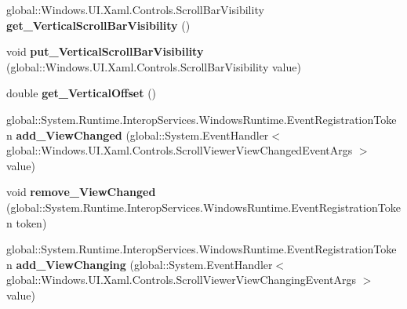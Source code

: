 \begin{DoxyCompactItemize}
\mbox{\label{class_windows_1_1_u_i_1_1_xaml_1_1_controls_1_1_scroll_viewer_ae2150cc90ac054e44b19688d45254504}} 
global\+::\+Windows.\+U\+I.\+Xaml.\+Controls.\+Scroll\+Bar\+Visibility {\bfseries get\+\_\+\+Vertical\+Scroll\+Bar\+Visibility} ()
\item 
\mbox{\label{class_windows_1_1_u_i_1_1_xaml_1_1_controls_1_1_scroll_viewer_a4ebc42955ec0b6a9d1bb937a99db8d5a}} 
void {\bfseries put\+\_\+\+Vertical\+Scroll\+Bar\+Visibility} (global\+::\+Windows.\+U\+I.\+Xaml.\+Controls.\+Scroll\+Bar\+Visibility value)
\item 
\mbox{\label{class_windows_1_1_u_i_1_1_xaml_1_1_controls_1_1_scroll_viewer_a19208c9fc6f7a5b20ce2809e891eaf0a}} 
double {\bfseries get\+\_\+\+Vertical\+Offset} ()
\item 
\mbox{\label{class_windows_1_1_u_i_1_1_xaml_1_1_controls_1_1_scroll_viewer_ac4976aefef665f53fb870e4ce8813d73}} 
global\+::\+System.\+Runtime.\+Interop\+Services.\+Windows\+Runtime.\+Event\+Registration\+Token {\bfseries add\+\_\+\+View\+Changed} (global\+::\+System.\+Event\+Handler$<$ global\+::\+Windows.\+U\+I.\+Xaml.\+Controls.\+Scroll\+Viewer\+View\+Changed\+Event\+Args $>$ value)
\item 
\mbox{\label{class_windows_1_1_u_i_1_1_xaml_1_1_controls_1_1_scroll_viewer_a317f11553250f27cac32f2a138b5c4b4}} 
void {\bfseries remove\+\_\+\+View\+Changed} (global\+::\+System.\+Runtime.\+Interop\+Services.\+Windows\+Runtime.\+Event\+Registration\+Token token)
\item 
\mbox{\label{class_windows_1_1_u_i_1_1_xaml_1_1_controls_1_1_scroll_viewer_a8696c8cbca169c5458cf7c1bc6e483a9}} 
global\+::\+System.\+Runtime.\+Interop\+Services.\+Windows\+Runtime.\+Event\+Registration\+Token {\bfseries add\+\_\+\+View\+Changing} (global\+::\+System.\+Event\+Handler$<$ global\+::\+Windows.\+U\+I.\+Xaml.\+Controls.\+Scroll\+Viewer\+View\+Changing\+Event\+Args $>$ value)
\item 

\end{DoxyCompactItemize}
